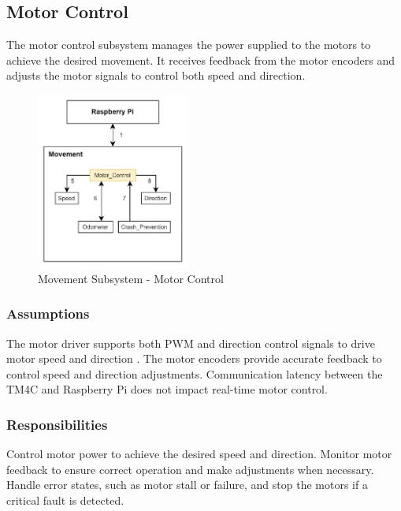 \newpage


\subsection{Motor Control}
The motor control subsystem manages the power supplied to the motors to achieve the desired movement. It receives feedback from the motor encoders and adjusts the motor signals to control both speed and direction.

\begin{figure}[h!]
	\centering
 	\includegraphics[width=0.45\textwidth]{images/movement/motor_control.jpg}
 \caption{Movement Subsystem - Motor Control} %
\end{figure}

\subsubsection{Assumptions}
The motor driver supports both PWM and direction control signals to drive motor speed and direction \cite{DimensionEngineeringSabertooth2x25}. The motor encoders provide accurate feedback to control speed and direction adjustments. Communication latency between the TM4C and Raspberry Pi does not impact real-time motor control.

\subsubsection{Responsibilities}
Control motor power to achieve the desired speed and direction. Monitor motor feedback to ensure correct operation and make adjustments when necessary. Handle error states, such as motor stall or failure, and stop the motors if a critical fault is detected.

